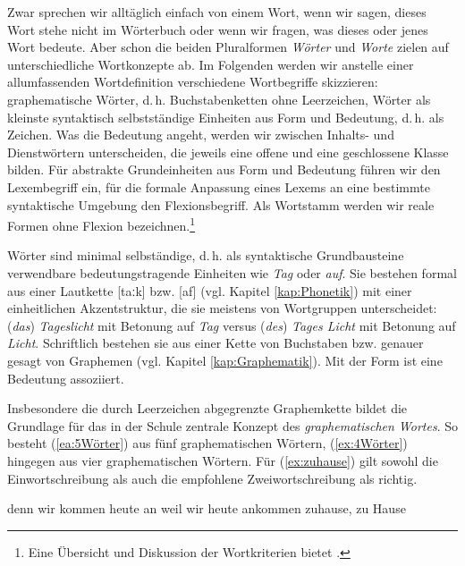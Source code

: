 Zwar sprechen wir alltäglich einfach von einem Wort, \zB wenn wir sagen, dieses Wort stehe nicht im Wörterbuch oder wenn wir fragen, was dieses oder jenes Wort bedeute. Aber schon die beiden Pluralformen \textit{Wörter} und \textit{Worte} zielen auf unterschiedliche Wortkonzepte ab. Im Folgenden werden wir anstelle einer allumfassenden Wortdefinition verschiedene Wortbegriffe skizzieren: graphematische Wörter, d.\,h. Buchstabenketten ohne Leerzeichen, Wörter als kleinste syntaktisch selbstständige Einheiten aus Form und Bedeutung, d.\,h. als Zeichen. Was die Bedeutung angeht, werden wir zwischen Inhalts- und Dienstwörtern unterscheiden, die jeweils eine offene und eine geschlossene Klasse bilden. Für abstrakte Grundeinheiten aus Form und Bedeutung führen wir den Lexembegriff ein, für die formale Anpassung eines Lexems an eine bestimmte syntaktische Umgebung den Flexionsbegriff. Als Wortstamm werden wir reale Formen ohne Flexion bezeichnen.\footnote{Eine Übersicht und Diskussion der Wortkriterien bietet \citet[30--35]{Wurzel2000}.}

Wörter sind minimal selbständige, d.\,h. als syntaktische Grundbausteine verwendbare bedeutungstragende Einheiten wie \zB \textit{Tag} oder \textit{auf}. Sie bestehen formal aus einer Lautkette {[taːk]} bzw. {[a\textupsilon f]} (vgl. Kapitel \ref{kap:Phonetik}) mit einer einheitlichen Akzentstruktur, die sie meistens von Wortgruppen unterscheidet: (\textit{das}) \textit{Tageslicht} mit Betonung auf \textit{Tag} versus (\textit{des}) \textit{Tages Licht} mit Betonung auf \textit{Licht}. Schriftlich bestehen sie aus einer Kette von Buchstaben bzw. genauer gesagt von Graphemen (vgl. Kapitel \ref{kap:Graphematik}). Mit der Form ist eine Bedeutung assoziiert.

Insbesondere die durch Leerzeichen abgegrenzte Graphemkette bildet die Grundlage für das in der Schule zentrale Konzept des \textit{graphematischen Wortes}. So besteht (\ref{ea:5Wörter}) aus fünf graphematischen Wörtern, (\ref{ex:4Wörter}) hingegen aus vier graphematischen Wörtern. Für (\ref{ex:zuhause}) gilt sowohl die Einwortschreibung als auch die empfohlene Zweiwortschreibung als richtig.

\ea \label{ea:graph_Wort}
\ea \label{ea:5Wörter} denn wir kommen heute an
\ex \label{ex:4Wörter} weil wir heute ankommen
\ex \label{ex:zuhause} zuhause, zu Hause 
\z 
\z 

